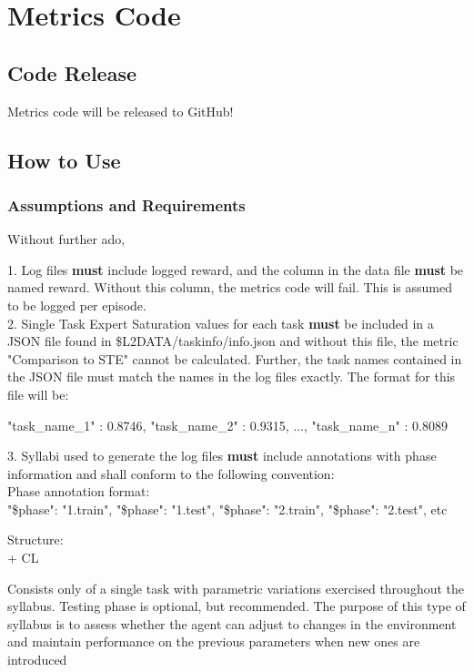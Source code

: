 \chapter{Metrics Code}\label{ch:metrics_code}

\section{Code Release}

Metrics code will be released to GitHub!

\section{How to Use} 

\subsection*{Assumptions and Requirements}

Without further ado, 

1. Log files \textbf{must} include logged reward, and the column in the data file \textbf{must} be named reward. Without this column, the metrics code will fail. This is assumed to be logged per episode. \\

2. Single Task Expert Saturation values for each task \textbf{must} be included in a JSON file found in \$L2DATA/taskinfo/info.json and without this file, the metric "Comparison to STE" cannot be calculated. Further, the task names contained in the JSON file must match the names in the log files exactly. The format for this file will be: 
    
    {
    "task\_name\_1" : 0.8746,
    "task\_name\_2" : 0.9315,
    ...,
    "task\_name\_n" : 0.8089
    }

3. Syllabi used to generate the log files \textbf{must} include annotations with phase information and shall conform to the following convention:\\
    
Phase annotation format:\\
    {"\$phase":  "1.train"}, {"\$phase":  "1.test"}, {"\$phase":  "2.train"}, {"\$phase":  "2.test"}, etc

Structure:\\
    
    + CL

    Consists only of a single task with parametric variations exercised throughout the syllabus. Testing phase is optional, 
    but recommended. The purpose of this type of syllabus is to assess whether the agent can adjust to changes in the 
    environment and maintain performance on the previous parameters when new ones are introduced

